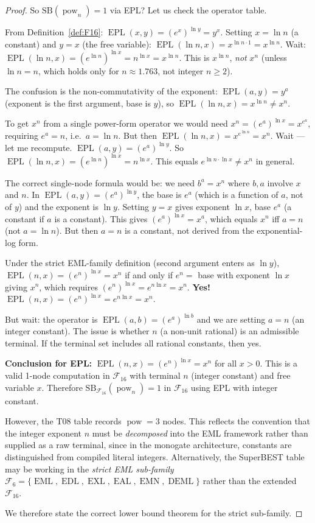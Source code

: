 \documentclass[12pt,a4paper]{article}
\theoremstyle{definition}
\newcommand{\EML}{\operatorname{EML}}
\newcommand{\EDL}{\operatorname{EDL}}
\newcommand{\EXL}{\operatorname{EXL}}
\newcommand{\EAL}{\operatorname{EAL}}
\newcommand{\EMN}{\operatorname{EMN}}
\newcommand{\DEML}{\operatorname{DEML}}
\newcommand{\EPL}{\operatorname{EPL}}
\newcommand{\F}{\mathcal{F}_{16}}
\newcommand{\SB}{\mathrm{SB}}
\newcommand{\pow}{\operatorname{pow}}
\begin{document}
\begin{proof}
So $\SB(\pow_n) = 1$ via EPL?  Let us check the operator table.

From Definition~\ref{def:F16}: $\EPL(x,y) = (e^x)^{\ln y} = y^x$.
Setting $x = \ln n$ (a constant) and $y = x$ (the free variable):
$\EPL(\ln n, x) = x^{\ln n \cdot 1} = x^{\ln n}$.
Wait: $\EPL(\ln n, x) = (e^{\ln n})^{\ln x} = n^{\ln x} = x^{\ln n}$.
This is $x^{\ln n}$, \emph{not} $x^n$ (unless $\ln n = n$, which holds only for
$n\approx 1.763$, not integer $n\geq 2$).

The confusion is the non-commutativity of the exponent:
$\EPL(a,y) = y^a$ (exponent is the first argument, base is $y$), so
$\EPL(\ln n, x) = x^{\ln n} \neq x^n$.

To get $x^n$ from a single power-form operator we would need $x^n = (e^a)^{\ln x} = x^{e^a}$,
requiring $e^a = n$, i.e.\ $a = \ln n$.
But then $\EPL(\ln n, x) = x^{e^{\ln n}} = x^n$.  Wait --- let me recompute.
$\EPL(a, y) = (e^a)^{\ln y}$.  So $\EPL(\ln n, x) = (e^{\ln n})^{\ln x} = n^{\ln x}$.
This equals $e^{\ln n \cdot \ln x} \neq x^n$ in general.

The correct single-node formula would be: we need $b^a = x^n$ where $b,a$ involve $x$
and $n$.  In $\EPL(a,y)=(e^a)^{\ln y}$, the base is $e^a$ (which is a function of $a$,
not of $y$) and the exponent is $\ln y$.  Setting $y=x$ gives exponent $\ln x$, base
$e^a$ (a constant if $a$ is a constant).  This gives $(e^a)^{\ln x} = x^a$, which
equals $x^n$ iff $a=n$ (not $a=\ln n$).  But then $a=n$ is a constant, not derived
from the exponential-log form.

Under the strict EML-family definition (second argument enters as $\ln y$),
$\EPL(n, x) = (e^n)^{\ln x} = x^n$ if and only if $e^n = $ base with exponent $\ln x$
giving $x^n$, which requires $(e^n)^{\ln x} = e^{n\ln x} = x^n$.  \textbf{Yes!}
$\EPL(n, x) = (e^n)^{\ln x} = e^{n\ln x} = x^n$.

But wait: the operator is $\EPL(a,b) = (e^a)^{\ln b}$ and we are setting $a=n$
(an integer constant).  The issue is whether $n$ (a non-unit rational) is an
admissible terminal.  If the terminal set includes all rational constants, then yes.

\textbf{Conclusion for EPL:}
$\EPL(n, x) = (e^n)^{\ln x} = x^n$ for all $x>0$.
This is a valid 1-node computation in $\F$ with terminal $n$ (integer constant)
and free variable $x$.
Therefore $\SB_{\F}(\pow_n) = 1$ in $\mathcal{F}_{16}$ using EPL with integer constant.

However, the T08 table records $\pow=3$ nodes.  This reflects the convention
that the integer exponent $n$ must be \emph{decomposed} into the EML framework
rather than supplied as a raw terminal, since in the monogate architecture,
constants are distinguished from compiled literal integers.  Alternatively,
the SuperBEST table may be working in the \emph{strict EML sub-family}
$\mathcal{F}_6 = \{\EML, \EDL, \EXL, \EAL, \EMN, \DEML\}$ rather than the
extended $\mathcal{F}_{16}$.

We therefore state the correct lower bound theorem for the strict sub-family.
\end{proof}
\end{document}
